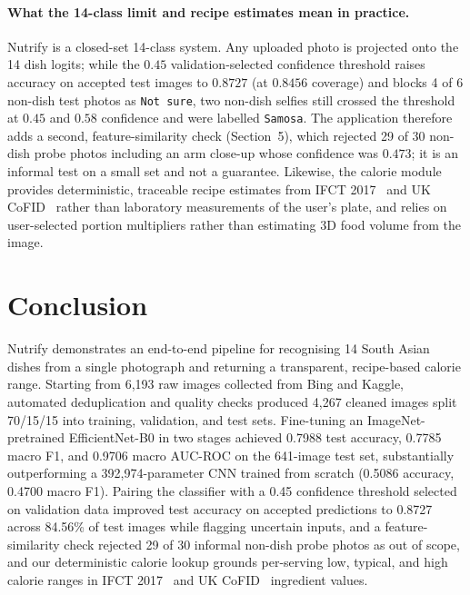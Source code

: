 \documentclass[11pt,a4paper]{article}
\begin{document}
\paragraph{What the 14-class limit and recipe estimates mean in practice.}
Nutrify is a closed-set 14-class system. Any uploaded photo is projected onto
the 14 dish logits; while the $0.45$ validation-selected confidence threshold
raises accuracy on accepted test images to $0.8727$ (at $0.8456$ coverage) and
blocks 4 of 6 non-dish test photos as \texttt{Not sure}, two non-dish selfies
still crossed the threshold at $0.45$ and $0.58$ confidence and were labelled
\texttt{Samosa}. The application therefore adds a second, feature-similarity check
(Section~5), which rejected 29 of 30 non-dish probe photos including an arm
close-up whose confidence was $0.473$; it is an informal test on a small set and
not a guarantee. Likewise, the calorie module provides deterministic,
traceable recipe estimates from IFCT 2017~\cite{longvah2017ifct} and UK
CoFID~\cite{cofid2021} rather than laboratory measurements of the user's plate,
and relies on user-selected portion multipliers rather than estimating 3D food
volume from the image.

\section{Conclusion}
Nutrify demonstrates an end-to-end pipeline for recognising 14 South Asian
dishes from a single photograph and returning a transparent, recipe-based
calorie range. Starting from 6,193 raw images collected from Bing and Kaggle,
automated deduplication and quality checks produced 4,267 cleaned images split
70/15/15 into training, validation, and test sets. Fine-tuning an
ImageNet-pretrained EfficientNet-B0 in two stages achieved 0.7988 test
accuracy, 0.7785 macro F1, and 0.9706 macro AUC-ROC on the 641-image test set,
substantially outperforming a 392,974-parameter CNN trained from scratch
(0.5086 accuracy, 0.4700 macro F1). Pairing the classifier with a 0.45
confidence threshold selected on validation data improved test accuracy on
accepted predictions to 0.8727 across 84.56\% of test images while flagging
uncertain inputs, and a feature-similarity check rejected 29 of 30 informal non-dish
probe photos as out of scope, and our deterministic
calorie lookup grounds per-serving low, typical, and high calorie ranges in
IFCT 2017~\cite{longvah2017ifct} and UK CoFID~\cite{cofid2021} ingredient
values.
\end{document}
